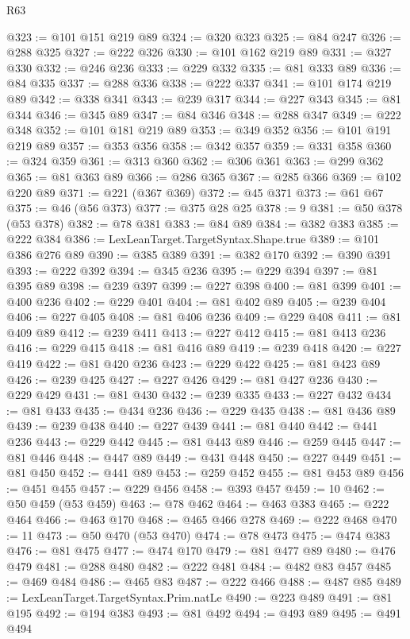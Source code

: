 \begin{lexlean}{R63}
\begin{coremodule}
@323 := @101 @151 @219 @89
@324 := @320 @323
@325 := @84 @247
@326 := @288 @325
@327 := @222 @326
@330 := @101 @162 @219 @89
@331 := @327 @330
@332 := @246 @236
@333 := @229 @332
@335 := @81 @333 @89
@336 := @84 @335
@337 := @288 @336
@338 := @222 @337
@341 := @101 @174 @219 @89
@342 := @338 @341
@343 := @239 @317
@344 := @227 @343
@345 := @81 @344
@346 := @345 @89
@347 := @84 @346
@348 := @288 @347
@349 := @222 @348
@352 := @101 @181 @219 @89
@353 := @349 @352
@356 := @101 @191 @219 @89
@357 := @353 @356
@358 := @342 @357
@359 := @331 @358
@360 := @324 @359
@361 := @313 @360
@362 := @306 @361
@363 := @299 @362
@365 := @81 @363 @89
@366 := @286 @365
@367 := @285 @366
@369 := @102 @220 @89
@371 := @221 (@367 @369)
@372 := @45 @371
@373 := @61 @67
@375 := @46 (@56 @373)
@377 := @375 @28 @25
@378 := 9
@381 := @50 @378 (@53 @378)
@382 := @78 @381
@383 := @84 @89
@384 := @382 @383
@385 := @222 @384
@386 := LexLeanTarget.TargetSyntax.Shape.true
@389 := @101 @386 @276 @89
@390 := @385 @389
@391 := @382 @170
@392 := @390 @391
@393 := @222 @392
@394 := @345 @236
@395 := @229 @394
@397 := @81 @395 @89
@398 := @239 @397
@399 := @227 @398
@400 := @81 @399
@401 := @400 @236
@402 := @229 @401
@404 := @81 @402 @89
@405 := @239 @404
@406 := @227 @405
@408 := @81 @406 @236
@409 := @229 @408
@411 := @81 @409 @89
@412 := @239 @411
@413 := @227 @412
@415 := @81 @413 @236
@416 := @229 @415
@418 := @81 @416 @89
@419 := @239 @418
@420 := @227 @419
@422 := @81 @420 @236
@423 := @229 @422
@425 := @81 @423 @89
@426 := @239 @425
@427 := @227 @426
@429 := @81 @427 @236
@430 := @229 @429
@431 := @81 @430
@432 := @239 @335
@433 := @227 @432
@434 := @81 @433
@435 := @434 @236
@436 := @229 @435
@438 := @81 @436 @89
@439 := @239 @438
@440 := @227 @439
@441 := @81 @440
@442 := @441 @236
@443 := @229 @442
@445 := @81 @443 @89
@446 := @259 @445
@447 := @81 @446
@448 := @447 @89
@449 := @431 @448
@450 := @227 @449
@451 := @81 @450
@452 := @441 @89
@453 := @259 @452
@455 := @81 @453 @89
@456 := @451 @455
@457 := @229 @456
@458 := @393 @457
@459 := 10
@462 := @50 @459 (@53 @459)
@463 := @78 @462
@464 := @463 @383
@465 := @222 @464
@466 := @463 @170
@468 := @465 @466 @278
@469 := @222 @468
@470 := 11
@473 := @50 @470 (@53 @470)
@474 := @78 @473
@475 := @474 @383
@476 := @81 @475
@477 := @474 @170
@479 := @81 @477 @89
@480 := @476 @479
@481 := @288 @480
@482 := @222 @481
@484 := @482 @83 @457
@485 := @469 @484
@486 := @465 @83
@487 := @222 @466
@488 := @487 @85
@489 := LexLeanTarget.TargetSyntax.Prim.natLe
@490 := @223 @489
@491 := @81 @195
@492 := @194 @383
@493 := @81 @492
@494 := @493 @89
@495 := @491 @494

\end{coremodule}
\end{lexlean}
